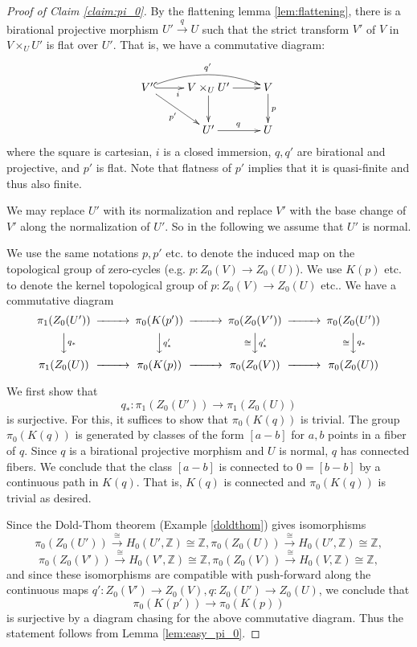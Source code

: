 \documentclass{amsart}
\theoremstyle{definition}
\theoremstyle{remark}
\newcommand{\mbb}{\mathbb}
\newcommand{\ZZ}{\mbb{Z}}
\begin{document}
\begin{proof}[Proof of Claim \ref{claim:pi_0}]
    By the flattening lemma \ref{lem:flattening}, 
    there is a birational projective  morphism $U' \xrightarrow{q} U$ such that the strict transform $V'$ of $V$ in $V \times_U U'$ is flat over $U'$. That is, we have a commutative diagram:
\[
\xymatrix{
V' \ar[rd]_{p'} \ar@{^{(}->}[r]_i \ar@/^1pc/[rr]^{q'}
&V\times_U U' \ar[d]\ar[r]
&V \ar[d]^p\\
&U' \ar[r]^q &U
}
\]
where the square is cartesian, $i$ is a closed immersion, $q, q'$ are birational and projective, and $p'$ is flat.
Note that flatness of $p'$ implies that it is quasi-finite and thus also finite.

We may replace $U'$ with its normalization and replace $V'$ with the base change of $V'$ along the normalization of $U'$. So in the following we assume that $U'$ is normal.

We use the same notations $p, p'$ etc. to denote the induced map on the topological group of zero-cycles (e.g. $p:Z_0(V) \to Z_0(U)$). We use $K(p)$ etc. to denote the kernel topological group of $p: Z_0(V) \to Z_0(U)$ etc.. 
We have a commutative diagram
\[
\begin{CD}
    \pi_1(Z_0(U')) @>>> \pi_0(K(p'))@>>> \pi_0(Z_0(V')) @>>> \pi_0(Z_0(U'))\\
    @VVq_*V @VVq_*'V @V\cong Vq_*' V @V\cong Vq_*V\\
    \pi_1(Z_0(U)) @>>> \pi_0(K(p))@>>> \pi_0(Z_0(V)) @>>> \pi_0(Z_0(U))\\
\end{CD}
\]



We first show that 
\[
q_*: \pi_1(Z_0(U'))  \to \pi_1(Z_0(U)) 
\]
is surjective. 
For this, it suffices to show that $\pi_0(K(q))$ is trivial.
 The group $\pi_0(K(q))$ is generated by classes of the form $[a-b]$ for $a, b$ points in a fiber of $q$. Since $q$ is a birational projective morphism and $U$ is normal, $q$ has connected fibers. We conclude that the class $[a-b]$ is connected to $0=[b-b]$ by a continuous path in $K(q)$. That is, $K(q)$ is connected and $\pi_0(K(q))$ is trivial as desired.


Since the Dold-Thom theorem (Example \ref{doldthom}) gives isomorphisms
\[
\pi_0(Z_0(U')) \xrightarrow{\cong} H_0(U', \ZZ) \cong \ZZ,  \pi_0(Z_0(U))\xrightarrow{\cong}H_0(U', \ZZ) \cong \ZZ, 
\]
\[
\pi_0(Z_0(V')) \xrightarrow{\cong}H_0(V', \ZZ) \cong \ZZ, \pi_0(Z_0(V)) \xrightarrow{\cong}H_0(V, \ZZ) \cong \ZZ, 
\]
and since these isomorphisms are compatible with push-forward along the continuous maps $q': Z_0(V') \to Z_0(V), q: Z_0(U') \to Z_0(U)$,
we conclude that
\[
\pi_0(K(p')) \to \pi_0(K(p))
\]
is surjective by a diagram chasing for the above commutative diagram.
Thus the statement follows from Lemma \ref{lem:easy_pi_0}.
\end{proof}
\end{document}
